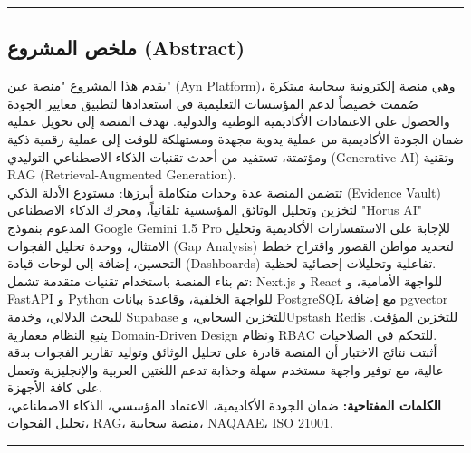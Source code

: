 \documentclass[12pt, a4paper]{report}
\begin{document}
\vspace{0.5cm}\hrule\vspace{0.5cm}
\newpage

\begin{center}

\chapter*{ملخص المشروع (Abstract)}

\end{center}

يقدم هذا المشروع "منصة عين" (Ayn Platform)، وهي منصة إلكترونية سحابية مبتكرة صُممت خصيصاً لدعم المؤسسات التعليمية في استعدادها لتطبيق معايير الجودة والحصول على الاعتمادات الأكاديمية الوطنية والدولية. تهدف المنصة إلى تحويل عملية ضمان الجودة الأكاديمية من عملية يدوية مجهدة ومستهلكة للوقت إلى عملية رقمية ذكية ومؤتمتة، تستفيد من أحدث تقنيات الذكاء الاصطناعي التوليدي (Generative AI) وتقنية RAG (Retrieval-Augmented Generation). \\

تتضمن المنصة عدة وحدات متكاملة أبرزها: مستودع الأدلة الذكي (Evidence Vault) لتخزين وتحليل الوثائق المؤسسية تلقائياً، ومحرك الذكاء الاصطناعي "Horus AI" المدعوم بنموذج Google Gemini 1.5 Pro للإجابة على الاستفسارات الأكاديمية وتحليل الامتثال، ووحدة تحليل الفجوات (Gap Analysis) لتحديد مواطن القصور واقتراح خطط التحسين، إضافة إلى لوحات قيادة (Dashboards) تفاعلية وتحليلات إحصائية لحظية. \\

تم بناء المنصة باستخدام تقنيات متقدمة تشمل: Next.js و React للواجهة الأمامية، و FastAPI و Python للواجهة الخلفية، وقاعدة بيانات PostgreSQL مع إضافة pgvector للبحث الدلالي، وخدمة Supabase للتخزين السحابي، وUpstash Redis للتخزين المؤقت. يتبع النظام معمارية Domain-Driven Design ونظام RBAC للتحكم في الصلاحيات. \\

أثبتت نتائج الاختبار أن المنصة قادرة على تحليل الوثائق وتوليد تقارير الفجوات بدقة عالية، مع توفير واجهة مستخدم سهلة وجذابة تدعم اللغتين العربية والإنجليزية وتعمل على كافة الأجهزة. \\

\textbf{الكلمات المفتاحية:} ضمان الجودة الأكاديمية، الاعتماد المؤسسي، الذكاء الاصطناعي، تحليل الفجوات، RAG، منصة سحابية، NAQAAE، ISO 21001. \\

\vspace{0.5cm}\hrule\vspace{0.5cm}
\end{document}
